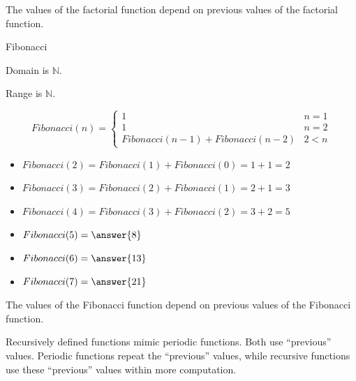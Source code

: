 \documentclass{ximera}
\begin{document}
The values of the factorial function depend on previous values of the factorial function. 












\begin{example}  Fibonacci


Domain is $\mathbb{N}$. 

Range is $\mathbb{N}$. 



\[
Fibonacci(n) = 
\begin{cases}
  1 & n = 1 \\
  1 & n = 2 \\ 
  Fibonacci(n-1) + Fibonacci(n-2) & 2 < n
\end{cases}
\]


\begin{itemize}
\item $Fibonacci(2) = Fibonacci(1) + Fibonacci(0) = 1 + 1 = 2$
\item $Fibonacci(3) = Fibonacci(2) + Fibonacci(1) = 2 + 1 = 3$
\item $Fibonacci(4) = Fibonacci(3) + Fibonacci(2) = 3 + 2 = 5$
\end{itemize}




\begin{question} 


\begin{itemize}
\item $Fibonacci(5) = \answer{8}$
\item $Fibonacci(6) = \answer{13}$
\item $Fibonacci(7) = \answer{21}$
\end{itemize}


\end{question}



\end{example}

The values of the Fibonacci function depend on previous values of the Fibonacci function.





Recursively defined functions mimic periodic functions.  Both use ``previous'' values.  Periodic functions repeat the ``previous'' values, while recursive functions use these ``previous'' values within more computation. \\
\end{document}
